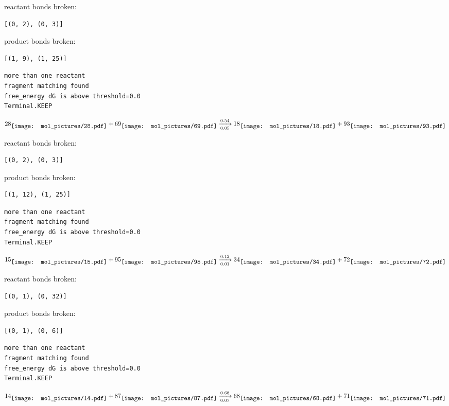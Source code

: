 \documentclass{article}
\begin{document}
reactant bonds broken:\begin{verbatim}
[(0, 2), (0, 3)]
\end{verbatim}
product bonds broken:\begin{verbatim}
[(1, 9), (1, 25)]
\end{verbatim}




\vspace{1cm}
\begin{verbatim}
more than one reactant
fragment matching found
free_energy dG is above threshold=0.0
Terminal.KEEP
\end{verbatim}
$$
28
\raisebox{-.5\height}{\texttt{[image: mol\_pictures/28.pdf]}}
+
69
\raisebox{-.5\height}{\texttt{[image: mol\_pictures/69.pdf]}}
\xrightarrow[0.05]{0.54}
18
\raisebox{-.5\height}{\texttt{[image: mol\_pictures/18.pdf]}}
+
93
\raisebox{-.5\height}{\texttt{[image: mol\_pictures/93.pdf]}}
$$


reactant bonds broken:\begin{verbatim}
[(0, 2), (0, 3)]
\end{verbatim}
product bonds broken:\begin{verbatim}
[(1, 12), (1, 25)]
\end{verbatim}




\vspace{1cm}
\begin{verbatim}
more than one reactant
fragment matching found
free_energy dG is above threshold=0.0
Terminal.KEEP
\end{verbatim}
$$
15
\raisebox{-.5\height}{\texttt{[image: mol\_pictures/15.pdf]}}
+
95
\raisebox{-.5\height}{\texttt{[image: mol\_pictures/95.pdf]}}
\xrightarrow[0.01]{0.12}
34
\raisebox{-.5\height}{\texttt{[image: mol\_pictures/34.pdf]}}
+
72
\raisebox{-.5\height}{\texttt{[image: mol\_pictures/72.pdf]}}
$$


reactant bonds broken:\begin{verbatim}
[(0, 1), (0, 32)]
\end{verbatim}
product bonds broken:\begin{verbatim}
[(0, 1), (0, 6)]
\end{verbatim}




\vspace{1cm}
\begin{verbatim}
more than one reactant
fragment matching found
free_energy dG is above threshold=0.0
Terminal.KEEP
\end{verbatim}
$$
14
\raisebox{-.5\height}{\texttt{[image: mol\_pictures/14.pdf]}}
+
87
\raisebox{-.5\height}{\texttt{[image: mol\_pictures/87.pdf]}}
\xrightarrow[0.07]{0.68}
68
\raisebox{-.5\height}{\texttt{[image: mol\_pictures/68.pdf]}}
+
71
\raisebox{-.5\height}{\texttt{[image: mol\_pictures/71.pdf]}}
$$
\end{document}
